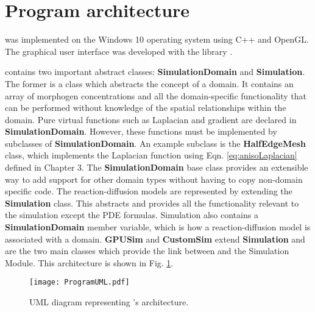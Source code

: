 \section{Program architecture} 
\ProgramName{} was implemented on the Windows 10 operating system using C++ and OpenGL. The graphical user interface was developed with the library  \citep{cornut2019}.

\ProgramName{} contains two important abstract classes: \textbf{SimulationDomain} and \textbf{Simulation}. The former is a class which abstracts the concept of a domain. It contains an array of morphogen concentrations and all the domain-specific functionality that can be performed without knowledge of the spatial relationships within the domain. Pure virtual functions such as Laplacian and gradient are declared in \textbf{SimulationDomain}. However, these functions must be implemented by subclasses of \textbf{SimulationDomain}. An example subclass is the \textbf{HalfEdgeMesh} class, which implements the Laplacian function using Eqn. \ref{eq:anisoLaplacian} defined in Chapter 3. The \textbf{SimulationDomain} base class provides an extensible way to add support for other domain types without having to copy non-domain specific code. The reaction-diffusion models are represented by extending the \textbf{Simulation} class. This abstracts and provides all the functionality relevant to the simulation except the PDE formulas. Simulation also contains a \textbf{SimulationDomain} member variable, which is how a reaction-diffusion model is associated with a domain. \textbf{GPUSim} and \textbf{CustomSim} extend \textbf{Simulation} and are the two main classes which provide the link between \ProgramName{} and the Simulation Module. This architecture is shown in Fig. \ref{fig:umlDiagram}.

\begin{figure}[H]
	\centering
	\texttt{[image: ProgramUML.pdf]}
	\caption[UML diagram representing \ProgramName{}'s architecture]{UML diagram representing \ProgramName{}'s architecture.}
	\label{fig:umlDiagram}
\end{figure}

